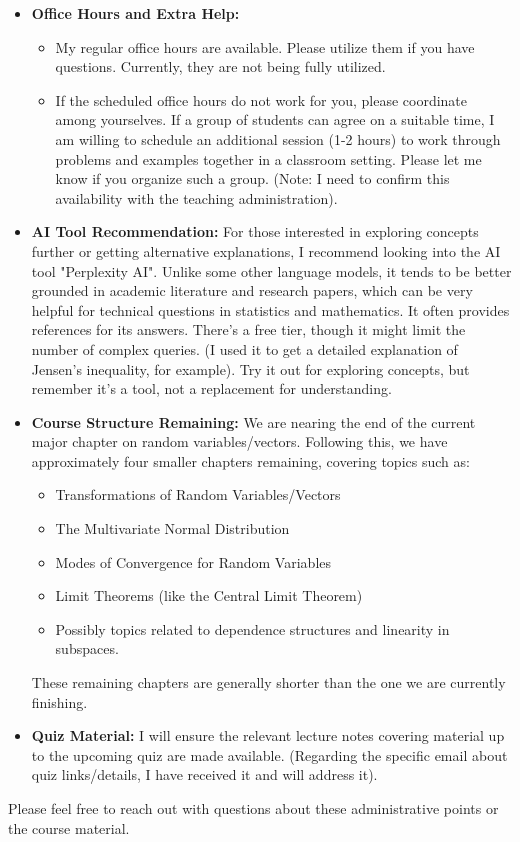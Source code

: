 \documentclass[11pt]{article}
\theoremstyle{definition} %
\begin{document}
\begin{itemize}
\begin{itemize}
        \end{itemize}
    \item \textbf{Office Hours and Extra Help:}
        \begin{itemize}
            \item My regular office hours are available. Please utilize them if you have questions. Currently, they are not being fully utilized.
            \item If the scheduled office hours do not work for you, please coordinate among yourselves. If a group of students can agree on a suitable time, I am willing to schedule an additional session (1-2 hours) to work through problems and examples together in a classroom setting. Please let me know if you organize such a group. (Note: I need to confirm this availability with the teaching administration).
        \end{itemize}
    \item \textbf{AI Tool Recommendation:} For those interested in exploring concepts further or getting alternative explanations, I recommend looking into the AI tool "Perplexity AI". Unlike some other language models, it tends to be better grounded in academic literature and research papers, which can be very helpful for technical questions in statistics and mathematics. It often provides references for its answers. There's a free tier, though it might limit the number of complex queries. (I used it to get a detailed explanation of Jensen's inequality, for example). Try it out for exploring concepts, but remember it's a tool, not a replacement for understanding.
    \item \textbf{Course Structure Remaining:} We are nearing the end of the current major chapter on random variables/vectors. Following this, we have approximately four smaller chapters remaining, covering topics such as:
        \begin{itemize}
            \item Transformations of Random Variables/Vectors
            \item The Multivariate Normal Distribution
            \item Modes of Convergence for Random Variables
            \item Limit Theorems (like the Central Limit Theorem)
            \item Possibly topics related to dependence structures and linearity in subspaces.
        \end{itemize}
    These remaining chapters are generally shorter than the one we are currently finishing.
    \item \textbf{Quiz Material:} I will ensure the relevant lecture notes covering material up to the upcoming quiz are made available. (Regarding the specific email about quiz links/details, I have received it and will address it).
\end{itemize}
Please feel free to reach out with questions about these administrative points or the course material.
\end{document}
